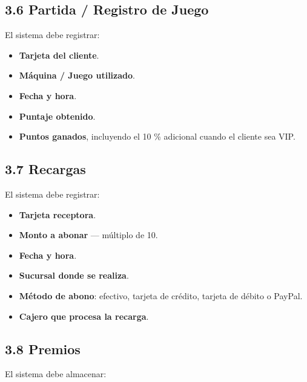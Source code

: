 \documentclass[12pt,a4paper]{article}
\begin{document}
\subsection*{3.6 Partida / Registro de Juego}

El sistema debe registrar:

\begin{itemize}
    \item \textbf{Tarjeta del cliente}.
    \item \textbf{Máquina / Juego utilizado}.
    \item \textbf{Fecha y hora}.
    \item \textbf{Puntaje obtenido}.
    \item \textbf{Puntos ganados}, incluyendo el 10 \% adicional cuando el cliente sea VIP.
\end{itemize}

\subsection*{3.7 Recargas}

El sistema debe registrar:

\begin{itemize}
    \item \textbf{Tarjeta receptora}.
    \item \textbf{Monto a abonar} --- múltiplo de 10.
    \item \textbf{Fecha y hora}.
    \item \textbf{Sucursal donde se realiza}.
    \item \textbf{Método de abono}: efectivo, tarjeta de crédito, tarjeta de débito o PayPal.
    \item \textbf{Cajero que procesa la recarga}.
\end{itemize}

\subsection*{3.8 Premios}

El sistema debe almacenar:
\end{document}
